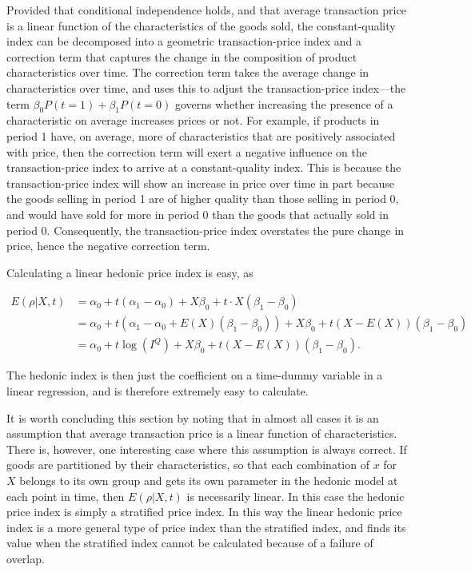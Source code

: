 \documentclass[]{article}
\begin{document}
Provided that conditional independence holds, and that average transaction price is a linear function of the characteristics of the goods sold, the constant-quality index can be decomposed into a geometric transaction-price index and a correction term that captures the change in the composition of product characteristics over time. The correction term takes the average change in characteristics over time, and uses this to adjust the transaction-price index---the term \(\beta_{0} P(t = 1) + \beta_{1} P(t = 0)\) governs whether increasing the presence of a characteristic on average increases prices or not. For example, if products in period 1 have, on average, more of characteristics that are positively associated with price, then the correction term will exert a negative influence on the transaction-price index to arrive at a constant-quality index. This is because the transaction-price index will show an increase in price over time in part because the goods selling in period 1 are of higher quality than those selling in period 0, and would have sold for more in period 0 than the goods that actually sold in period 0. Consequently, the transaction-price index overstates the pure change in price, hence the negative correction term.

Calculating a linear hedonic price index is easy, as

\begin{align*}
E(\rho | X, t) &= \alpha_{0} + t (\alpha_{1} - \alpha_{0}) + X \beta_{0} + t \cdot X (\beta_{1} - \beta_{0}) \\
&= \alpha_{0} + t (\alpha_{1} - \alpha_{0} + E(X)(\beta_{1} - \beta_{0})) + X \beta_{0} + t (X - E(X)) (\beta_{1} - \beta_{0}) \\
&= \alpha_{0} + t \log(I^{Q}) + X \beta_{0} + t (X - E(X)) (\beta_{1} - \beta_{0}).
\end{align*}

The hedonic index is then just the coefficient on a time-dummy variable in a linear regression, and is therefore extremely easy to calculate.

It is worth concluding this section by noting that in almost all cases it is an assumption that average transaction price is a linear function of characteristics. There is, however, one interesting case where this assumption is always correct. If goods are partitioned by their characteristics, so that each combination of \(x\) for \(X\) belongs to its own group and gets its own parameter in the hedonic model at each point in time, then \(E(\rho | X, t)\) is necessarily linear. In this case the hedonic price index is simply a stratified price index. In this way the linear hedonic price index is a more general type of price index than the stratified index, and finds its value when the stratified index cannot be calculated because of a failure of overlap.
\end{document}
